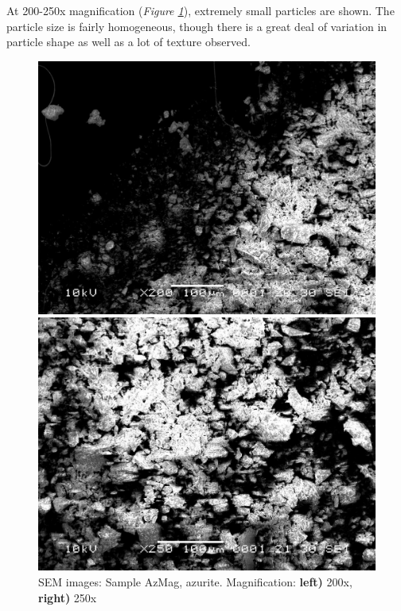 At 200-250x magnification (\textit{Figure \ref{fig:azmag_sem_1}}), extremely small particles are shown. The particle size is fairly homogeneous, though there is a great deal of variation in particle shape as well as a lot of texture observed.

\begin{figure}[H]
\centering
\begin{minipage}{.45\textwidth}
  \centering
  \includegraphics[width=\linewidth]{AzMag_x200_1_260221}
\end{minipage}
\begin{minipage}{.45\textwidth}
  \centering
  \includegraphics[width=\linewidth]{AzMag_x250_2_160321}
\end{minipage}
\caption[SEM images: Sample AzMag, azurite]{SEM images: Sample AzMag, azurite. Magnification: \textbf{left)} 200x, \textbf{right)} 250x}
\label{fig:azmag_sem_1}
\end{figure}

